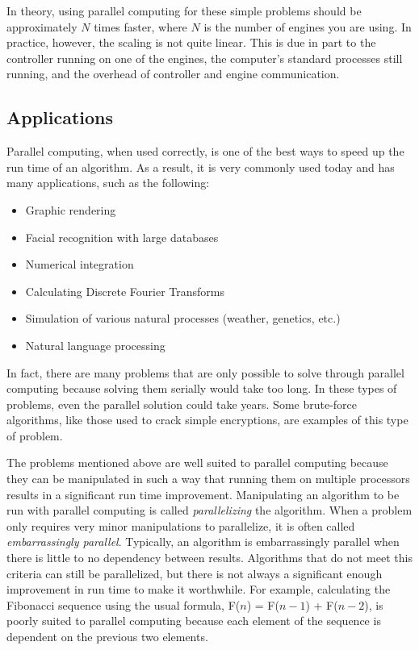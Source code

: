 In theory, using parallel computing for these simple problems should be approximately $N$ times faster, where $N$ is the number of engines you are using.
In practice, however, the scaling is not quite linear.
This is due in part to the controller running on one of the engines, the computer's standard processes still running, and the overhead of controller and engine communication.

\subsection*{Applications}
Parallel computing, when used correctly, is one of the best ways to speed up the run time of an algorithm.
As a result, it is very commonly used today and has many applications, such as the following:
\begin{itemize}
\item Graphic rendering
\item Facial recognition with large databases
\item Numerical integration
\item Calculating Discrete Fourier Transforms
\item Simulation of various natural processes (weather, genetics, etc.)
\item Natural language processing
\end{itemize}
In fact, there are many problems that are only possible to solve through parallel computing because solving them serially would take too long. 
In these types of problems, even the parallel solution could take years. 
Some brute-force algorithms, like those used to crack simple encryptions, are examples of this type of problem.

The problems mentioned above are well suited to parallel computing because they can be manipulated in such a way that running them on multiple processors results in a significant run time improvement.
Manipulating an algorithm to be run with parallel computing is called \emph{parallelizing} the algorithm. 
When a problem only requires very minor manipulations to parallelize, it is often called \emph{embarrassingly parallel}.
Typically, an algorithm is embarrassingly parallel when there is little to no dependency between results.
Algorithms that do not meet this criteria can still be parallelized, but there is not always a significant enough improvement in run time to make it worthwhile. 
For example, calculating the Fibonacci sequence using the usual formula, F($n$) = F($n-1$) + F($n-2$), is poorly suited to parallel computing because each element of the sequence is dependent on the previous two elements.


